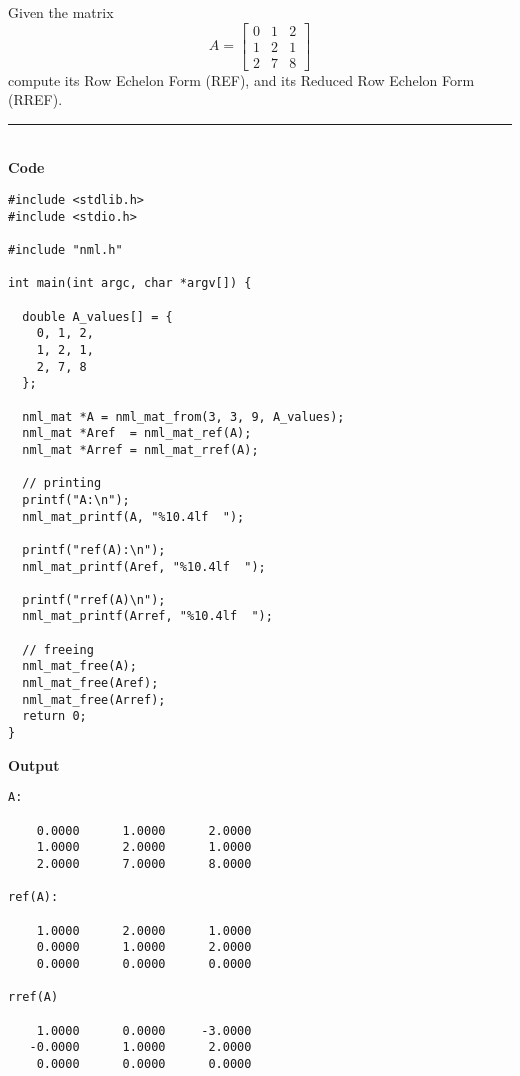 \textsf{
\example Given the matrix
$$
A = \left[
\begin{array}{rrr}
0 & 1 & 2 \\
1 & 2 & 1 \\
2 & 7 & 8
\end{array}
\right]
$$
compute its Row Echelon Form (REF), and its Reduced Row Echelon Form (RREF).
}

\rule{80mm}{0.5pt}\\
{\bf Code}
\begin{verbatim}
#include <stdlib.h>
#include <stdio.h>

#include "nml.h"

int main(int argc, char *argv[]) {

  double A_values[] = {
    0, 1, 2,
    1, 2, 1,
    2, 7, 8
  };

  nml_mat *A = nml_mat_from(3, 3, 9, A_values);
  nml_mat *Aref  = nml_mat_ref(A);
  nml_mat *Arref = nml_mat_rref(A);

  // printing
  printf("A:\n");                       
  nml_mat_printf(A, "%10.4lf  ");

  printf("ref(A):\n");                       
  nml_mat_printf(Aref, "%10.4lf  ");

  printf("rref(A)\n");                       
  nml_mat_printf(Arref, "%10.4lf  ");

  // freeing
  nml_mat_free(A); 
  nml_mat_free(Aref);
  nml_mat_free(Arref);
  return 0;
}
\end{verbatim}

\hsep
{\bf Output}
\begin{verbatim}
A:

    0.0000      1.0000      2.0000  
    1.0000      2.0000      1.0000  
    2.0000      7.0000      8.0000  

ref(A):

    1.0000      2.0000      1.0000  
    0.0000      1.0000      2.0000  
    0.0000      0.0000      0.0000  

rref(A)

    1.0000      0.0000     -3.0000  
   -0.0000      1.0000      2.0000  
    0.0000      0.0000      0.0000  
\end{verbatim}


